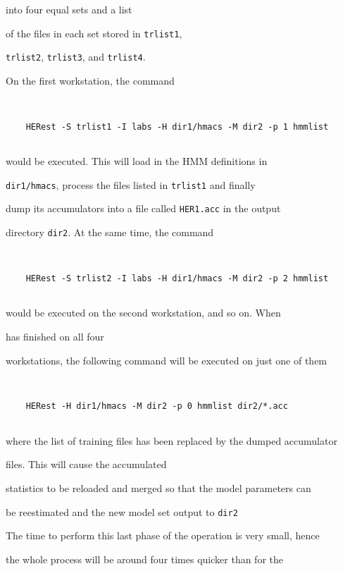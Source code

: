 into four equal sets and a list


of the files in each set stored in {\tt trlist1}, 


{\tt trlist2}, {\tt trlist3}, and {\tt trlist4}.


On the first workstation, the command


\begin{verbatim}


    HERest -S trlist1 -I labs -H dir1/hmacs -M dir2 -p 1 hmmlist


\end{verbatim}


would be executed.  This will load in the HMM definitions in 


{\tt dir1/hmacs}, process the files listed in {\tt trlist1} and finally


dump its accumulators into a file called {\tt HER1.acc} in the output


directory {\tt dir2}.  At the same time, the command


\begin{verbatim}


    HERest -S trlist2 -I labs -H dir1/hmacs -M dir2 -p 2 hmmlist


\end{verbatim}


would be executed on the second workstation, and so on.  When 


 has finished on all four


workstations,  the following command will be executed on just one of them


\begin{verbatim}


    HERest -H dir1/hmacs -M dir2 -p 0 hmmlist dir2/*.acc


\end{verbatim}


where the list of training files has been replaced by the dumped accumulator


files.  This will cause the accumulated


statistics to be reloaded and merged so that the model parameters can


be reestimated and the new model set output to \texttt{dir2}


The time to perform this last phase of the operation is very small, hence


the whole process will be around four times quicker than for the



